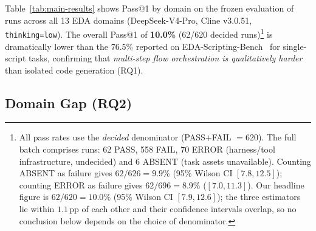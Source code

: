 
Table~\ref{tab:main-results} shows Pass@1 by domain on the frozen evaluation of \Neval{} runs across all 13 EDA domains (DeepSeek-V4-Pro, Cline v3.0.51, \texttt{thinking=low}). The overall Pass@1 of \textbf{10.0\%} (62/620 decided runs)\footnote{All pass rates use the \emph{decided} denominator (PASS$+$FAIL $=620$). The full batch comprises \Neval{} runs: 62 PASS, 558 FAIL, 70 ERROR (harness/tool infrastructure, undecided) and 6 ABSENT (task assets unavailable). Counting ABSENT as failure gives $62/626=9.9\%$ (95\% Wilson CI $[7.8,12.5]$); counting ERROR as failure gives $62/696=8.9\%$ ($[7.0,11.3]$). Our headline figure is $62/620=10.0\%$ (95\% Wilson CI $[7.9,12.6]$); the three estimators lie within $1.1$\,pp of each other and their confidence intervals overlap, so no conclusion below depends on the choice of denominator.} is dramatically lower than the 76.5\% reported on EDA-Scripting-Bench~\cite{zhu2026edascript} for single-script tasks, confirming that \emph{multi-step flow orchestration is qualitatively harder} than isolated code generation (RQ1).

\subsection{Domain Gap (RQ2)}
\label{sec:domain-gap}


